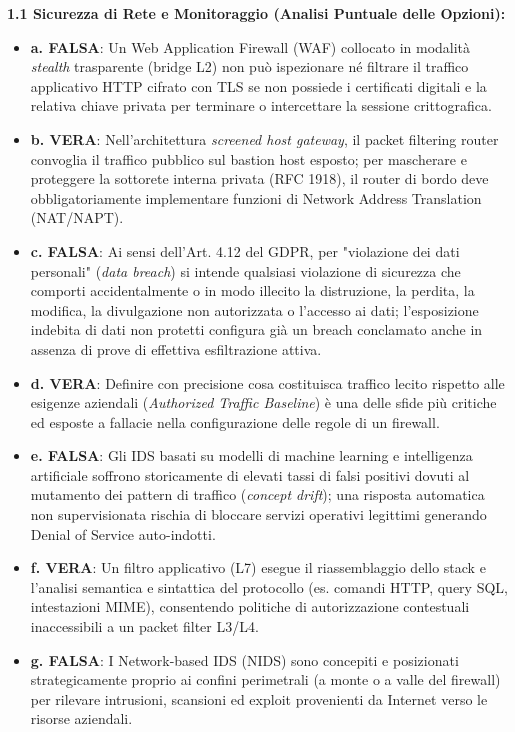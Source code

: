 \documentclass[11pt,a4paper]{article}
\begin{document}
\begin{solutionbox}
\textbf{1.1 Sicurezza di Rete e Monitoraggio (Analisi Puntuale delle Opzioni):}
\begin{itemize}
    \item \textbf{a. FALSA}: Un Web Application Firewall (WAF) collocato in modalit\`a \textit{stealth} trasparente (bridge L2) non pu\`o ispezionare n\'e filtrare il traffico applicativo HTTP cifrato con TLS se non possiede i certificati digitali e la relativa chiave privata per terminare o intercettare la sessione crittografica.
    \item \textbf{b. VERA}: Nell'architettura \textit{screened host gateway}, il packet filtering router convoglia il traffico pubblico sul bastion host esposto; per mascherare e proteggere la sottorete interna privata (RFC 1918), il router di bordo deve obbligatoriamente implementare funzioni di Network Address Translation (NAT/NAPT).
    \item \textbf{c. FALSA}: Ai sensi dell'Art. 4.12 del GDPR, per "violazione dei dati personali" (\textit{data breach}) si intende qualsiasi violazione di sicurezza che comporti accidentalmente o in modo illecito la distruzione, la perdita, la modifica, la divulgazione non autorizzata o l'accesso ai dati; l'esposizione indebita di dati non protetti configura gi\`a un breach conclamato anche in assenza di prove di effettiva esfiltrazione attiva.
    \item \textbf{d. VERA}: Definire con precisione cosa costituisca traffico lecito rispetto alle esigenze aziendali (\textit{Authorized Traffic Baseline}) \`e una delle sfide pi\`u critiche ed esposte a fallacie nella configurazione delle regole di un firewall.
    \item \textbf{e. FALSA}: Gli IDS basati su modelli di machine learning e intelligenza artificiale soffrono storicamente di elevati tassi di falsi positivi dovuti al mutamento dei pattern di traffico (\textit{concept drift}); una risposta automatica non supervisionata rischia di bloccare servizi operativi legittimi generando Denial of Service auto-indotti.
    \item \textbf{f. VERA}: Un filtro applicativo (L7) esegue il riassemblaggio dello stack e l'analisi semantica e sintattica del protocollo (es. comandi HTTP, query SQL, intestazioni MIME), consentendo politiche di autorizzazione contestuali inaccessibili a un packet filter L3/L4.
    \item \textbf{g. FALSA}: I Network-based IDS (NIDS) sono concepiti e posizionati strategicamente proprio ai confini perimetrali (a monte o a valle del firewall) per rilevare intrusioni, scansioni ed exploit provenienti da Internet verso le risorse aziendali.

\end{itemize}
\end{solutionbox}
\end{document}
